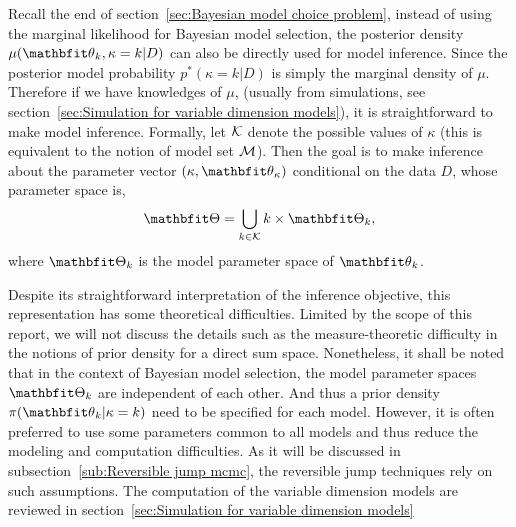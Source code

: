 Recall the end of section~\ref{sec:Bayesian model choice problem}, instead of
using the marginal likelihood for Bayesian model selection, the posterior
density $\mu(\bth_k,\kappa=k|D)$ can also be directly used for model
inference. Since the posterior model probability $p^*(\kappa=k|D)$ is simply
the marginal density of $\mu$. Therefore if we have knowledges of $\mu$,
(usually from simulations, see section~\ref{sec:Simulation for variable
  dimension models}), it is straightforward to make model inference. Formally,
let $\mathcal{K}$ denote the possible values of $\kappa$ (this is equivalent to the
notion of model set $\mathcal{M}$). Then the goal is to make inference about the
parameter vector $(\kappa, \bth_{\kappa})$ conditional on the data $D$, whose
parameter space is,
\begin{equation}
  \bTh = \bigcup_{k\in\calK}{k}\times\bTh_k,
  \label{eq:variable dimension parameter space}
\end{equation}
where $\bTh_k$ is the model parameter space of $\bth_k$.

Despite its straightforward interpretation of the inference objective, this
representation has some theoretical difficulties. Limited by the scope of this
report, we will not discuss the details such as the measure-theoretic
difficulty in the notions of prior density for a direct sum space.
Nonetheless, it shall be noted that in the context of Bayesian model
selection, the model parameter spaces $\bTh_k$ are independent of each other.
And thus a prior density $\pi(\bth_k|\kappa =k)$ need to be specified for each
model. However, it is often preferred to use some parameters common to all
models and thus reduce the modeling and computation difficulties. As it will
be discussed in subsection~\ref{sub:Reversible jump mcmc}, the reversible jump
\mcmc techniques rely on such assumptions. The computation of the variable
dimension models are reviewed in section~\ref{sec:Simulation for variable
  dimension models}

